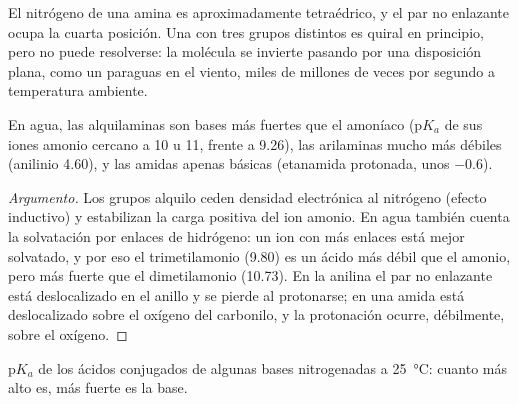 El nitrógeno de una amina es aproximadamente tetraédrico, y el par no enlazante ocupa la cuarta
posición. Una  con tres grupos distintos es quiral en principio, pero no puede
resolverse: la molécula se invierte pasando por una disposición plana, como un paraguas en el viento,
miles de millones de veces por segundo a temperatura ambiente.

\begin{proposition}[Basicidad]\label{prop:b2:amines:basicity}
En agua, las alquilaminas son bases más fuertes que el amoníaco ($\mathrm pK_a$ de sus iones amonio
cercano a 10 u 11, frente a 9.26), las arilaminas mucho más débiles (anilinio 4.60), y las amidas apenas
básicas (etanamida protonada, unos $-0.6$).
\end{proposition}

\begin{proof}[Argumento]
Los grupos alquilo ceden densidad electrónica al nitrógeno (efecto inductivo) y estabilizan la
carga positiva del ion amonio. En agua también cuenta la solvatación por enlaces de hidrógeno: un
ion con más enlaces  está mejor solvatado, y por eso el trimetilamonio (9.80) es un
ácido más débil que el amonio, pero más fuerte que el dimetilamonio (10.73). En la anilina el par
no enlazante está deslocalizado en el anillo y se pierde al protonarse; en una amida está deslocalizado
sobre el oxígeno del carbonilo, y la protonación ocurre, débilmente, sobre el oxígeno.
\end{proof}

\begin{omfigure}

{\small $\mathrm pK_a$ de los ácidos conjugados de algunas bases nitrogenadas a
\qty{25}{\degreeCelsius}: cuanto más alto es, más fuerte es la base.}
\end{omfigure}


